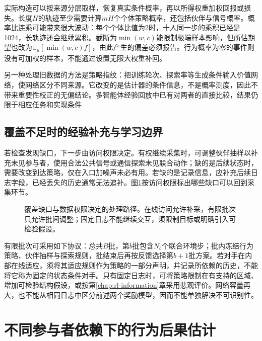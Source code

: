 实际构造可以按来源分层取样，恢复真实条件概率，再以所得权重加权回报或损失。长度$H$的轨迹至少需要计算$mH$个个体策略概率，还包括伙伴与信号概率。概率比连乘可能带来很大波动：每个个体比值为2时，十人同一步的乘积已经是1024，长轨迹还会继续累积。截断为$\min(w,c)$能限制极端样本影响，但所估期望也改为$\mathbb E_\mu[\min(w,c)f]$，由此产生的偏差必须报告。行为概率为零的事件则没有可加权的样本，不能通过设置无限大权重补回。

另一种处理旧数据的方法是策略指纹：把训练轮次、探索率等生成条件输入价值网络，使网络区分不同来源。它改变的是估计器的条件信息，不是概率测度，因此不带来重要性校正的无偏结论。多智能体经验回放中已有对两者的直接比较，结果仍限于相应任务和实现条件

\subsection{覆盖不足时的经验补充与学习边界}
\label{sec:rl-multi-agent-data-boundary}

若检查发现缺口，下一步由访问权限决定。有权继续采集时，可调整伙伴抽样以补充未见参与者，使用合法公共信号或通信探索未见联合动作；缺的是后续状态时，需要改变到达策略，仅在入口加噪声未必有用。若缺的是记录信息，应补充后续日志字段，已经丢失的历史通常无法追补。图\ref{fig:rl-multi-agent-data-loop}按访问权限标出哪些缺口可以回到采集环节。

\begin{figure}[htbp]
 \centering
 
 \caption{覆盖缺口与数据权限决定的处理路径。在线访问允许补采，有限批次只允许批间调整；固定日志不能继续交互，须限制目标或明确引入可检验假设。}
 \label{fig:rl-multi-agent-data-loop}
\end{figure}

有限批次可采用如下协议：总共$B$批，第$b$批包含$N_b$个联合环境步；批内冻结行为策略、伙伴抽样与探索规则，批结束后再按反馈选择第$b+1$批方案。若对手在内部在线适应，须将其适应规则作为策略的一部分声明，并记录所依赖的历史，不能将它称为固定的状态条件对手。只有固定日志时，可将策略限制在有支持的区域、增加可检验结构假设，或按第\ref{chap:rl-information}章采用悲观评价。网络容量再大，也不能从相同日志中区分前述两个奖励模型，因而不能单独解决不可识别性。

\section{不同参与者依赖下的行为后果估计}
\label{sec:rl-multi-agent-estimation}

